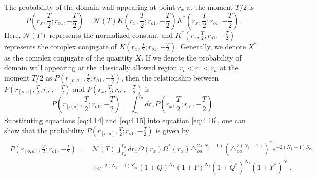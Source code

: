 \documentclass[12pt]{article}
\begin{document}
The probability of the domain wall \uppercase\expandafter{} appearing at point $r_{x}$ at the moment $T/2$ is
\begin{equation}
\label{eq:4.15}%
P(r_{x},\frac{T}{2}; r_{o1}, -\frac{T}{2})=\mathscr{N}(T)K(r_{x},\frac{T}{2}; r_{o1}, -\frac{T}{2})K^{*}(r_{x},\frac{T}{2}; r_{o1}, -\frac{T}{2}).
\end{equation}
Here, $\mathscr{N}(T)$ represents the normalized constant and $K^{*}(r_{x},\frac{T}{2}; r_{o1}, -\frac{T}{2})$ represents the complex conjugate of $K(r_{x},\frac{T}{2}; r_{o1}, -\frac{T}{2})$. Generally, we denote $X^{*}$ as the complex conjugate of the quantity $X$. If we denote the probability of domain wall \uppercase\expandafter{} appearing at the classically allowed region $r_{o}<r_{1}<r_{a}$ at the moment $T/2$ as $P(r_{[o,a]},\frac{T}{2}; r_{o1}, -\frac{T}{2})$, then the relationship between $P(r_{[o,a]},\frac{T}{2}; r_{o1}, -\frac{T}{2})$ and $P(r_{x},\frac{T}{2}; r_{o1}, -\frac{T}{2})$ is
\begin{equation}
\label{eq:4.16}%
P(r_{[o,a]},\frac{T}{2}; r_{o1}, -\frac{T}{2})=\int_{r_{o}}^{r_{a}}dr_{x}P(r_{x},\frac{T}{2}; r_{o1}, -\frac{T}{2}).
\end{equation}
Substituting equations \eqref{eq:4.14} and \eqref{eq:4.15} into equation \eqref{eq:4.16}, one can show that the probability $P(r_{[o,a]},\frac{T}{2}; r_{o1}, -\frac{T}{2})$ is given by
\begin{eqnarray}\begin{split}
\label{eq:4.17}%
P(r_{[o,a]},\frac{T}{2}; r_{o1}, -\frac{T}{2})=&\mathscr{N}(T)\int_{r_{o}}^{r_{a}}dr_{x}\Omega(r_{x})\Omega^{*}(r_{x})\triangle_{oa}^{2(N_{1}-1)}(\triangle_{oa}^{2(N_{1}-1)})^{*} e^{-2(N_{1}-1)S_{oa}}\\&\times e^{-2(N_{1}-1)S_{oa}^{*}}
(1+Q)^{N_{1}}(1+Y)^{N_{1}}(1+Q^{*})^{N_{1}}(1+Y^{*})^{N_{1}}.
\end{split}
\end{eqnarray}
\end{document}
